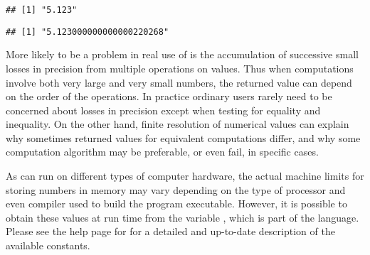 \documentclass[krantz2]{krantz}\usepackage{knitr}
\begin{document}
\begin{explainbox}
\begin{knitrout}\footnotesize
{}\color{fgcolor}\begin{kframe}
\begin{alltt}
\hlstd{(}\hlstd{,}  \hlstd{=} \hlstd{)} 
\end{alltt}
\begin{verbatim}
## [1] "5.123"
\end{verbatim}
\begin{alltt}
\hlstd{(}\hlstd{,}  \hlstd{=} \hlstd{)} 
\end{alltt}
\begin{verbatim}
## [1] "5.123000000000000220268"
\end{verbatim}
\end{kframe}
\end{knitrout}

More likely to be a problem in real use of \Rlang is the accumulation of successive small losses in precision from multiple operations on \Rlang {} values. Thus when computations involve both very large and very small numbers, the returned value can depend on the order of the operations. In practice ordinary users rarely need to be concerned about losses in precision except when testing for equality and inequality. On the other hand, finite resolution of  numerical values can explain why sometimes returned values for equivalent computations differ, and why some computation algorithm may be preferable, or even fail, in specific cases.

As \Rpgrm can run on different types of computer hardware, the actual machine limits for storing numbers in memory may vary depending on the type of processor and even compiler used to build the \Rpgrm program executable. However, it is possible to obtain these values at run time from the variable , which is part of the \Rlang language. Please see the help page for  for a detailed and up-to-date description of the available constants.


\end{explainbox}
\end{document}
